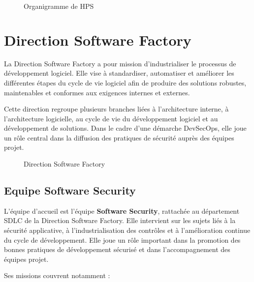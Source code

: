 \begin{figure}[h!]
    \centering
    \caption{Organigramme de HPS}
    \label{fig:organigramme-hps}
\end{figure}

\section{Direction Software Factory}

La Direction Software Factory a pour mission d'industrialiser le processus de développement logiciel. Elle vise à standardiser, automatiser et améliorer les différentes étapes du cycle de vie logiciel afin de produire des solutions robustes, maintenables et conformes aux exigences internes et externes.

Cette direction regroupe plusieurs branches liées à l'architecture interne, à l'architecture logicielle, au cycle de vie du développement logiciel et au développement de solutions. Dans le cadre d'une démarche DevSecOps, elle joue un rôle central dans la diffusion des pratiques de sécurité auprès des équipes projet.

\begin{figure}[h!]
    \centering
    \caption{Direction Software Factory}
    \label{fig:software-factory}
\end{figure}

\subsection{Equipe Software Security}

L'équipe d'accueil est l'équipe \textbf{Software Security}, rattachée au département SDLC de la Direction Software Factory. Elle intervient sur les sujets liés à la sécurité applicative, à l'industrialisation des contrôles et à l'amélioration continue du cycle de développement. Elle joue un rôle important dans la promotion des bonnes pratiques de développement sécurisé et dans l'accompagnement des équipes projet.

Ses missions couvrent notamment :

